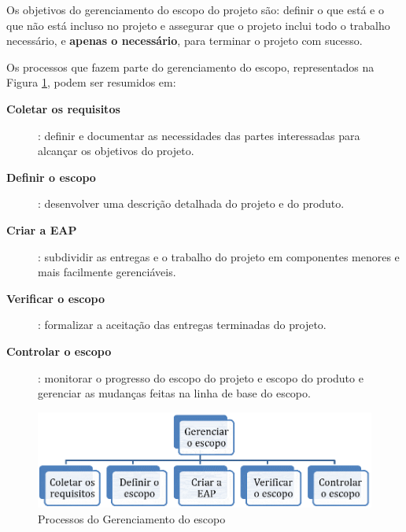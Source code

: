 


Os objetivos do gerenciamento do escopo do projeto são: definir o que está e o que não está incluso no projeto e assegurar que o projeto inclui todo o trabalho necessário, e \textbf{apenas o necessário}, para terminar o projeto com sucesso.

Os processos que fazem parte do gerenciamento do escopo, representados na Figura \ref{fig:proc:ger:escopo}, podem ser resumidos em:

\begin{description}
	
	\item[\textbf{Coletar os requisitos}]: definir e documentar as necessidades das partes interessadas para alcançar os objetivos do projeto.
	
	\item[\textbf{Definir o escopo}]: desenvolver uma descrição detalhada do projeto e do produto.
	
	\item[\textbf{Criar a EAP}]: subdividir as entregas e o trabalho do projeto em componentes menores e mais facilmente gerenciáveis.
	
	\item[\textbf{Verificar o escopo}]: formalizar a aceitação das entregas terminadas do projeto.
	
	\item[\textbf{Controlar o escopo}]: monitorar o progresso do escopo do projeto e escopo do produto e gerenciar as mudanças feitas na linha de base do escopo.	

\end{description}

\begin{figure}[!h]
	\centering
	\includegraphics[scale=0.75]{Figuras/gerenciamento_escopo.png}
	\caption{Processos do Gerenciamento do escopo}
	\label{fig:proc:ger:escopo}
\end{figure}

